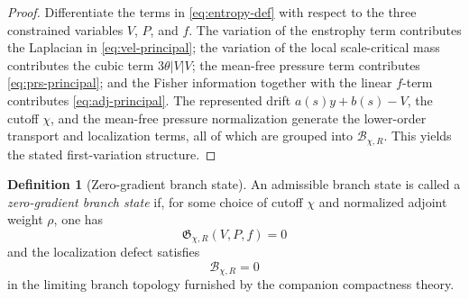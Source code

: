 \documentclass[11pt]{amsart}
\numberwithin{equation}{section}
\theoremstyle{plain}
\theoremstyle{definition}
\newtheorem{definition}[theorem]{Definition}
\theoremstyle{remark}
\newcommand{\EntropyGrad}{\mathfrak G}
\begin{document}
\begin{proof}
Differentiate the terms in \eqref{eq:entropy-def} with respect to the three
constrained variables \(V\), \(P\), and \(f\).  The variation of the enstrophy
term contributes the Laplacian in \eqref{eq:vel-principal}; the variation of
the local scale-critical mass contributes the cubic term \(3\theta |V|V\); the
mean-free pressure term contributes \eqref{eq:prs-principal}; and the Fisher
information together with the linear \(f\)-term contributes
\eqref{eq:adj-principal}.  The represented drift \(a(s)y+b(s)-V\), the cutoff
\(\chi\), and the mean-free pressure normalization generate the lower-order
transport and localization terms, all of which are grouped into
\(\mathcal B_{\chi,R}\).  This yields the stated first-variation structure.
\end{proof}

\begin{definition}[Zero-gradient branch state]
\label{def:zero-gradient-state}
An admissible branch state is called a \emph{zero-gradient branch state} if,
for some choice of cutoff \(\chi\) and normalized adjoint weight \(\rho\), one
has
\[
	\EntropyGrad_{\chi,R}(V,P,f)=0
\]
and the localization defect satisfies
\[
	\mathcal B_{\chi,R}=0
\]
in the limiting branch topology furnished by the companion compactness theory.
\end{definition}
\end{document}

